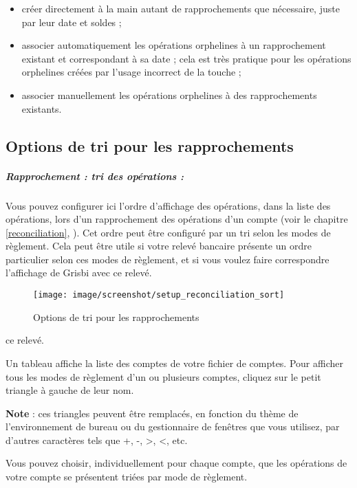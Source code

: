 \begin{itemize}
	\item créer directement à la main autant de rapprochements que nécessaire, juste par leur date et soldes ;
	\item associer automatiquement les opérations orphelines à un rapprochement existant et correspondant à sa date ; cela est très pratique pour les opérations orphelines créées par l'usage incorrect de la touche  ;
	\item associer manuellement les opérations orphelines à des rapprochements existants.
\end{itemize}


\subsection{Options de tri pour les rapprochements\label{setup-operations-sort}}

\subparagraph{Rapprochement : tri des opérations :}

Vous pouvez configurer ici l'ordre d'affichage des opérations, dans la liste des opérations, lors d'un rapprochement des opérations d'un compte (voir le chapitre \vref{reconciliation}, ). Cet ordre peut être configuré par un \gls{tri} selon les modes de règlement. Cela peut être utile si votre relevé bancaire présente un ordre particulier selon ces modes de règlement, et si vous voulez faire correspondre l'affichage de Grisbi avec \ifIllustration ce relevé.
\begin{figure}[htbp]
\begin{center}
\texttt{[image: image/screenshot/setup\_reconciliation\_sort]}
\end{center}
\caption{Options de tri pour les rapprochements}
\label{setup-reconciliation-sort-img}
\end{figure}
\else ce relevé.
\fi

Un tableau affiche la liste des comptes de votre fichier de comptes. Pour afficher tous les modes de règlement d'un ou plusieurs comptes, cliquez sur le petit triangle à gauche de leur nom.

\textbf{Note} : ces triangles peuvent être remplacés, en fonction du thème de l'environnement de bureau ou du gestionnaire de fenêtres que vous utilisez, par d'autres caractères tels que +, -, >, <, etc.

Vous pouvez choisir, individuellement pour chaque compte, que les opérations de votre compte se présentent triées par mode de règlement.

